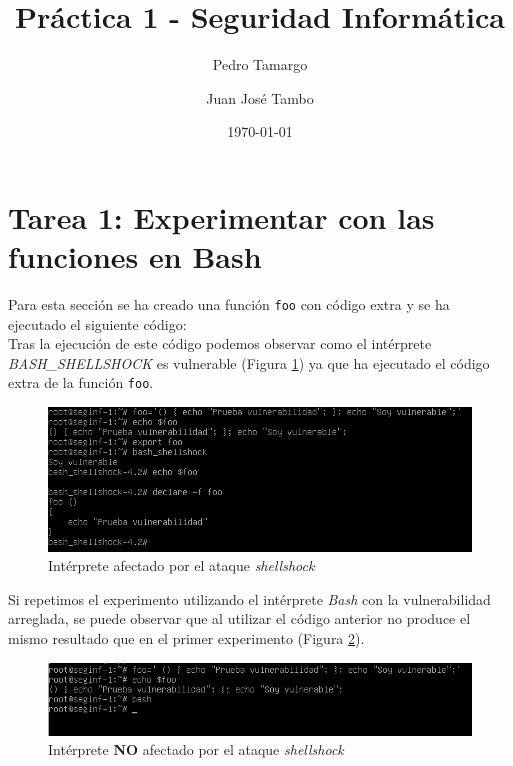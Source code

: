 \documentclass[10pt,a4paper]{article}
\begin{document}
\begin{titlepage}
\title{{\Huge Práctica 1 - Seguridad Informática}}
\author{Pedro Tamargo \and Juan José Tambo}
\date{\today}
\clearpage\maketitle
\thispagestyle{empty}
\tableofcontents
\end{titlepage}

\section{Tarea 1: Experimentar con las funciones en Bash}

Para esta sección se ha creado una función \texttt{foo} con código extra y se ha ejecutado el siguiente código:\\



Tras la ejecución de este código podemos observar como el intérprete \emph{BASH\_{}SHELLSHOCK} es vulnerable (Figura \ref{fig:tarea1_shellshock}) ya que ha ejecutado el código extra de la función \texttt{foo}.

\begin{figure}[h!]
\centering
\includegraphics[scale=0.6]{images/Tarea_1.png}
\caption{Intérprete afectado por el ataque \emph{shellshock}}
\label{fig:tarea1_shellshock} 
\end{figure}

Si repetimos el experimento utilizando el intérprete \emph{Bash} con la vulnerabilidad arreglada, se puede observar que al utilizar el código anterior no produce el mismo resultado que en el primer experimento (Figura \ref{fig:tarea1_bash_normal}).

\begin{figure}[h!]
\centering
\includegraphics[scale=0.6]{images/Tarea_1b.png}
\caption{Intérprete \textbf{NO} afectado por el ataque \emph{shellshock}}
\label{fig:tarea1_bash_normal} 
\end{figure}
\end{document}
